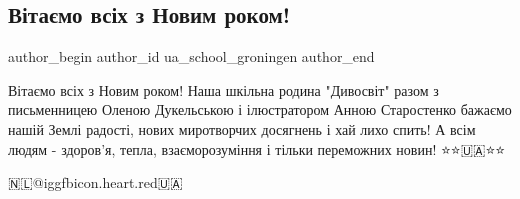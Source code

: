  
 
 
 
 
 
\subsection{Вітаємо всіх з Новим роком!}
\label{sec:31_12_2022.fb.ua_school_groningen.1.novyj_rik}
 
\ifcmt
 author_begin
   author_id ua_school_groningen
 author_end
\fi

Вітаємо всіх з Новим роком! Наша шкільна родина "Дивосвіт" разом з письменницею
Оленою Дукельською і ілюстратором Анною Старостенко  бажаємо нашій Землі
радості, нових миротворчих досягнень і хай лихо спить! А всім людям - здоров'я,
тепла, взаєморозуміння і тільки переможних новин! ⭐⭐🇺🇦⭐⭐

🇳🇱@igg{fbicon.heart.red}🇺🇦
